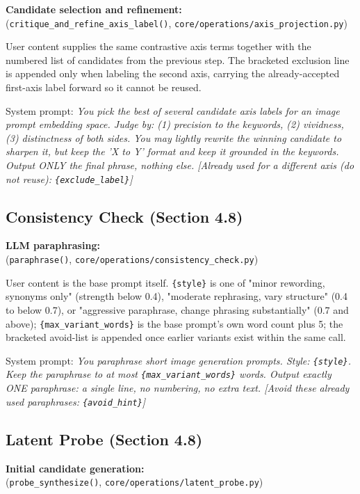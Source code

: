 \textbf{Candidate selection and refinement:}\\
(\texttt{critique\_and\_refine\_axis\_label()}, \texttt{core/operations/axis\_projection.py})

User content supplies the same contrastive axis terms together with the numbered list of candidates from the previous step. The bracketed exclusion line is appended only when labeling the second axis, carrying the already-accepted first-axis label forward so it cannot be reused.

System prompt: \textit{You pick the best of several candidate axis labels for an image prompt embedding space. Judge by: (1) precision to the keywords, (2) vividness, (3) distinctness of both sides. You may lightly rewrite the winning candidate to sharpen it, but keep the 'X to Y' format and keep it grounded in the keywords. Output ONLY the final phrase, nothing else. [Already used for a different axis (do not reuse): \texttt{\{exclude\_label\}}]}

\subsection{Consistency Check (Section 4.8)}\label{app:3-consistency-check}

\textbf{LLM paraphrasing:}\\
(\texttt{paraphrase()}, \texttt{core/operations/consistency\_check.py})

User content is the base prompt itself. \texttt{\{style\}} is one of "minor rewording, synonyms only" (strength below 0.4), "moderate rephrasing, vary structure" (0.4 to below 0.7), or "aggressive paraphrase, change phrasing substantially" (0.7 and above); \texttt{\{max\_variant\_words\}} is the base prompt's own word count plus 5; the bracketed avoid-list is appended once earlier variants exist within the same call.

System prompt: \textit{You paraphrase short image generation prompts. Style: \texttt{\{style\}}. Keep the paraphrase to at most \texttt{\{max\_variant\_words\}} words. Output exactly ONE paraphrase: a single line, no numbering, no extra text. [Avoid these already used paraphrases: \texttt{\{avoid\_hint\}}]}

\subsection{Latent Probe (Section 4.8)}\label{app:3-latent-probe}

\textbf{Initial candidate generation:}\\
(\texttt{probe\_synthesize()}, \texttt{core/operations/latent\_probe.py})

